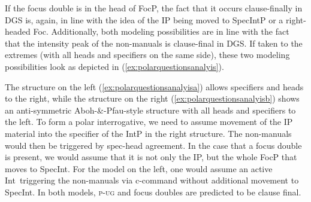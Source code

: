 If the focus double is in the head of FocP, the fact that it occurs clause-finally in DGS is, again, in line with the idea of the IP being moved to SpecIntP or a right-headed Foc\textdegree . Additionally, both modeling possibilities are in line with the fact that the intensity peak of the non-manuals is clause-final in DGS. If taken to the extremes (with all heads and specifiers on the same side), these two modeling possibilities look as depicted in (\ref{ex:polarquestionsanalyis}). 
\clearpage
\begin{exe}
\ex\label{ex:polarquestionsanalyis}
\begin{multicols}{2}
\begin{xlist}

\ex \label{ex:polarquestionsanalyisa}


\ex\label{ex:polarquestionsanalyisb}


\end{xlist}
\end{multicols}
\end{exe}

\vspace{-0.8cm}

\noindent The structure on the left (\ref{ex:polarquestionsanalyisa}) allows specifiers and heads to the right, while the structure on the right (\ref{ex:polarquestionsanalyisb}) shows an anti-symmetric Aboh-\&-Pfau-style structure with all heads and specifiers to the left. To form a polar interrogative, we need to assume movement of the IP material into the specifier of the IntP in the right structure. The non-manuals would then be triggered by spec-head agreement. In the case that a focus double is present, we would assume that it is not only the IP, but the whole FocP that moves to SpecInt. For the model on the left, one would assume an active Int\textdegree\ triggering the non-manuals via c-command without additional movement to SpecInt. In both models, \textsc{p-ug} and focus doubles are predicted to be clause final.

